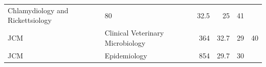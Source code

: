 \documentclass[11pt,]{article}
\begin{document}
\begin{longtable}[]{@{}llrrrr@{}}
\begin{minipage}[t]{0.43\columnwidth}
Chlamydiology and Rickettsiology\strut
\end{minipage} & \begin{minipage}[t]{0.04\columnwidth}\raggedleft\strut
80\strut
\end{minipage} & \begin{minipage}[t]{0.08\columnwidth}\raggedleft\strut
32.5\strut
\end{minipage} & \begin{minipage}[t]{0.11\columnwidth}\raggedleft\strut
25\strut
\end{minipage} & \begin{minipage}[t]{0.11\columnwidth}\raggedleft\strut
41\strut
\end{minipage}\tabularnewline
\begin{minipage}[t]{0.06\columnwidth}\raggedright\strut
JCM\strut
\end{minipage} & \begin{minipage}[t]{0.43\columnwidth}\raggedright\strut
Clinical Veterinary Microbiology\strut
\end{minipage} & \begin{minipage}[t]{0.04\columnwidth}\raggedleft\strut
364\strut
\end{minipage} & \begin{minipage}[t]{0.08\columnwidth}\raggedleft\strut
32.7\strut
\end{minipage} & \begin{minipage}[t]{0.11\columnwidth}\raggedleft\strut
29\strut
\end{minipage} & \begin{minipage}[t]{0.11\columnwidth}\raggedleft\strut
40\strut
\end{minipage}\tabularnewline
\begin{minipage}[t]{0.06\columnwidth}\raggedright\strut
JCM\strut
\end{minipage} & \begin{minipage}[t]{0.43\columnwidth}\raggedright\strut
Epidemiology\strut
\end{minipage} & \begin{minipage}[t]{0.04\columnwidth}\raggedleft\strut
854\strut
\end{minipage} & \begin{minipage}[t]{0.08\columnwidth}\raggedleft\strut
29.7\strut
\end{minipage} & \begin{minipage}[t]{0.11\columnwidth}\raggedleft\strut
30\strut
\end{minipage} & \begin{minipage}[t]{0.11\columnwidth}\raggedleft\strut

\end{minipage}
\end{longtable}
\end{document}
